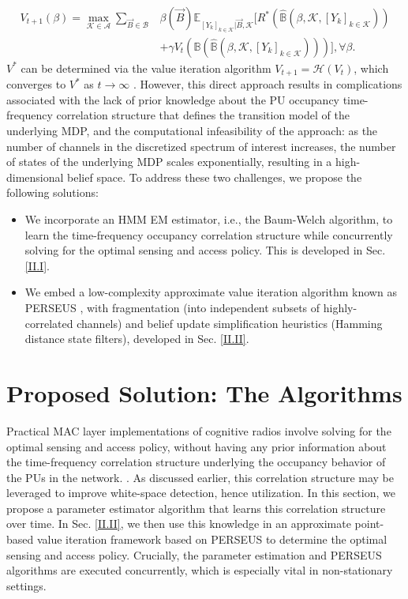 \documentclass[10pt, twocolumn]{IEEEtran}
\begin{document}
\begin{equation}\label{18}
    \begin{aligned}
        V_{t+1}(\beta){=}\max_{\mathcal{K}{\in}\mathcal{A}}\sum_{\vec{B}{\in}\mathcal{B}}&\beta(\vec{B})\mathbb{E}_{[Y_{k}]_{k{\in}\mathcal{K}}|\vec{B},\mathcal{K}}\Bigr[R^*(\hat{\mathbb{B}}(\beta,\mathcal{K},[Y_{k}]_{k{\in}\mathcal{K}}))\\&+\gamma V_{t}(\mathbb{B}(\hat{\mathbb{B}}(\beta,\mathcal{K},[Y_{k}]_{k{\in}\mathcal{K}})))\Bigr],{\forall}\beta.
    \end{aligned}
\end{equation}
$V^*$ can be determined via the value iteration algorithm
$V_{t+1}=\mathcal H(V_t)$, which converges to  $V^*$ as $t\to\infty$ \cite{PUOccupancy:18}. However, 
this direct approach results in complications associated with the lack of prior knowledge about the PU occupancy time-frequency correlation structure that defines the transition model of the underlying MDP, and the computational infeasibility of the approach: as the number of channels in the discretized spectrum of interest increases, the number of states of the underlying MDP scales exponentially, resulting in a high-dimensional belief space. To address these two challenges, we propose the following solutions:
\begin{itemize}
    \item We incorporate an HMM EM estimator, i.e., the Baum-Welch algorithm, to learn the time-frequency occupancy correlation structure while concurrently solving for the optimal sensing and access policy. This is developed in Sec. \ref{II.I}.
    \item We embed a low-complexity approximate value iteration algorithm known as PERSEUS \cite{WCL:13}, with fragmentation (into independent subsets of highly-correlated channels) and belief update simplification heuristics (Hamming distance state filters), developed in Sec. \ref{II.II}.
\end{itemize}
\vspace{-5mm}

\section{Proposed Solution: The Algorithms}\label{II}
Practical MAC layer implementations of cognitive radios involve solving for the optimal sensing and access policy, without having any prior information about the time-frequency correlation structure underlying the occupancy behavior of the PUs in the network. \cite{8935729, 8935774}. As discussed earlier, this correlation structure may be leveraged to improve  white-space detection, hence utilization. In this section, we propose a parameter estimator algorithm that learns this correlation structure over time. In Sec. \ref{II.II}, we then use this knowledge in an approximate
point-based value iteration framework based on PERSEUS \cite{WCL:13} to determine the optimal sensing and access policy. Crucially, the parameter estimation and PERSEUS algorithms are executed concurrently, which is especially vital in non-stationary settings.
\vspace{-5mm}
\end{document}
